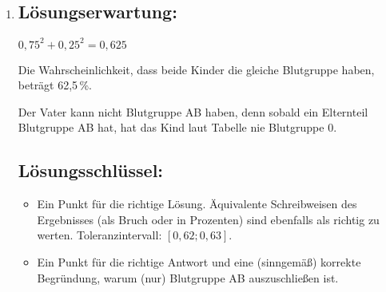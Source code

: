 \begin{langesbeispiel}
{\begin{enumerate}
	$n=150, h=0,48$
	
	$2\cdot\Phi(z)-1=0,95 \Rightarrow z=1,96$
	
	$h\pm z\cdot\sqrt{\frac{h\cdot (1-h)}{n}}=0,48\pm 1,96\cdot\sqrt{\frac{0,48\cdot (1-0,48)}{150}}\approx 0,48\pm 0,08 \Rightarrow [40\,\%;56\,\%]$
	
	Bei gleichem Stichprobenergebnis führen eine größere Stichprobe und/oder ein geringeres Konfidenzniveau zu einer Verringerung der Breite des Konfidenzintervalls.

	\subsection{Lösungsschlüssel:}
	
\begin{itemize}
	\item Ein Punkt für ein korrektes Intervall. Äquivalente Schreibweisen des Ergebnisses (als Bruch oder Dezimalzahl) sind ebenfalls als richtig zu werten. 
	
	Toleranzintervall für den unteren Wert: $[39\,\%; 43\,\%]$  
	
	Toleranzintervall für den oberen Wert: $[53\,\%; 57\,\%]$  
	
	Die Aufgabe ist auch dann als richtig gelöst zu werten, wenn bei korrektem Ansatz das Ergebnis aufgrund eines Rechenfehlers nicht richtig ist.
	\item Ein Punkt für eine (sinngemäß) korrekte Angabe der entsprechenden Änderungen beider  Parameter.
\end{itemize}

\item \subsection{Lösungserwartung:}
	$0,75^2+0,25^2=0,625$
	
	Die Wahrscheinlichkeit, dass beide Kinder die gleiche Blutgruppe haben, beträgt 62,5\,\%.
	
	Der Vater kann nicht Blutgruppe AB haben, denn sobald ein Elternteil Blutgruppe AB hat, hat das Kind laut Tabelle nie Blutgruppe 0.
	\subsection{Lösungsschlüssel:}
	
\begin{itemize}
	\item  Ein Punkt für die richtige Lösung. Äquivalente Schreibweisen des Ergebnisses (als Bruch oder in Prozenten) sind ebenfalls als richtig zu werten. Toleranzintervall: $[0,62; 0,63]$. 
	\item Ein Punkt für die richtige Antwort und eine (sinngemäß) korrekte Begründung, warum (nur) Blutgruppe AB auszuschließen ist.
\end{itemize}
\end{enumerate}}
		\end{langesbeispiel}